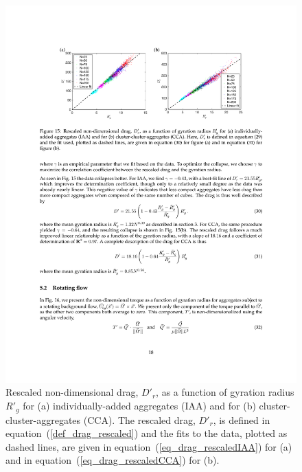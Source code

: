 \begin{figure}[ht]
	\begin{center}
		\includegraphics[scale = 1.0]{./figures/fig_drag_all_rescaledprime.pdf}
	\end{center}
	\caption{Rescaled non-dimensional drag, $D'_r$, as a function of gyration radius $R'_g$ for (a) individually-added aggregates (IAA) and for (b)  
	cluster-cluster-aggregates (CCA). The rescaled drag, $D'_r$, is defined in equation~(\ref{def_drag_rescaled})  and the fits to the data, plotted as dashed lines, are given in equation~(\ref{eq_drag_rescaledIAA}) for (a) and in equation~(\ref{eq_drag_rescaledCCA}) for (b).}
	\label{fig_drag_rescaled}
\end{figure}

